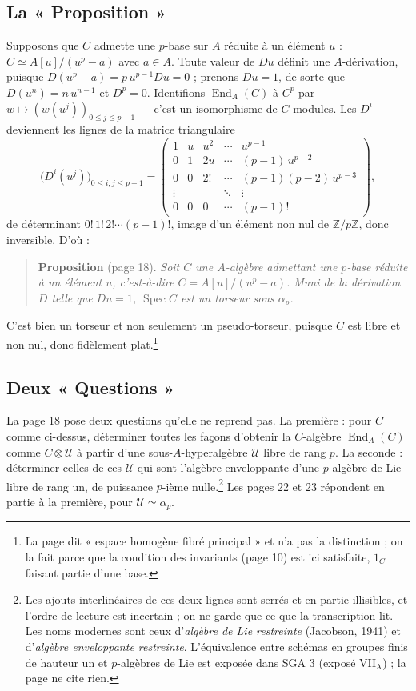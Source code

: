 \documentclass[11pt,a4paper]{article}
\begin{document}
\subsection*{La « Proposition »}

Supposons que $C$ admette une $p$-base sur $A$ réduite à un élément $u$ :
$C \simeq A[u]/(u^p - a)$ avec $a \in A$. Toute valeur de $Du$ définit une
$A$-dérivation, puisque $D(u^p - a) = p\, u^{p-1} Du = 0$ ; prenons $Du = 1$,
de sorte que $D(u^n) = n\, u^{n-1}$ et $D^p = 0$. Identifions
$\operatorname{End}_A(C)$ à $C^p$ par $w \mapsto (w(u^j))_{0 \le j \le p-1}$
--- c'est un isomorphisme de $C$-modules. Les $D^i$ deviennent les lignes de
la matrice triangulaire
\[
\bigl(D^i(u^j)\bigr)_{0 \le i, j \le p-1}
=
\begin{pmatrix}
1 & u & u^2 & \cdots & u^{p-1} \\
0 & 1 & 2u & \cdots & (p-1)\, u^{p-2} \\
0 & 0 & 2! & \cdots & (p-1)(p-2)\, u^{p-3} \\
\vdots & & & \ddots & \vdots \\
0 & 0 & 0 & \cdots & (p-1)!
\end{pmatrix},
\]
de déterminant $0!\,1!\,2!\cdots(p-1)!$, image d'un élément non nul de
$\mathbb{Z}/p\mathbb{Z}$, donc inversible. D'où :

\begin{quote}
\textbf{Proposition} (page 18). \emph{Soit $C$ une $A$-algèbre admettant une
$p$-base réduite à un élément $u$, c'est-à-dire $C = A[u]/(u^p - a)$. Muni de
la dérivation $D$ telle que $Du = 1$, $\operatorname{Spec} C$ est un torseur
sous $\alpha_p$.}
\end{quote}

C'est bien un torseur et non seulement un pseudo-torseur, puisque $C$ est
libre et non nul, donc fidèlement plat.\footnote{La page dit « espace homogène
fibré principal » et n'a pas la distinction ; on la fait parce que la
condition des invariants (page 10) est ici satisfaite, $1_C$ faisant partie
d'une base.}

\subsection*{Deux « Questions »}

La page 18 pose deux questions qu'elle ne reprend pas. La première :
pour $C$ comme ci-dessus, déterminer toutes les façons d'obtenir la
$C$-algèbre $\operatorname{End}_A(C)$ comme $C \otimes \mathcal{U}$ à partir
d'une sous-$A$-hyperalgèbre $\mathcal{U}$ libre de rang $p$. La seconde :
déterminer celles de ces $\mathcal{U}$ qui sont l'algèbre enveloppante d'une
$p$-algèbre de Lie libre de rang un, de puissance $p$-ième
nulle.\footnote{Les ajouts interlinéaires de ces deux lignes sont serrés et
en partie illisibles, et l'ordre de lecture est incertain ; on ne garde que
ce que la transcription lit. Les noms modernes sont ceux d'\emph{algèbre de
Lie restreinte} (Jacobson, 1941) et d'\emph{algèbre enveloppante restreinte}.
L'équivalence entre schémas en groupes finis de hauteur un et $p$-algèbres de
Lie est exposée dans SGA 3 (exposé VII$_{\mathrm{A}}$) ; la page ne cite
rien.} Les pages 22 et 23 répondent en partie à la première, pour
$\mathcal{U} \simeq \alpha_p$.
\end{document}
